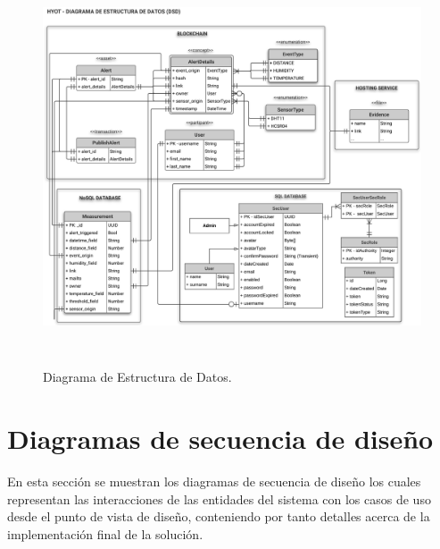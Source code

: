 \documentclass[12pt,a4paper, twoside]{report}
\begin{document}
	\begin{figure}[!ht]   
		\caption{Diagrama de Estructura de Datos.} 
		\begin{center} 
			\includegraphics[width=16cm,height=11cm]{Images/design/p_dsd} \\
			\label{fig:design_dsd} 
		\end{center}  
	\end{figure}
		
	\section{Diagramas de secuencia de diseño}
		
	En esta sección se muestran los diagramas de secuencia de diseño los cuales representan las interacciones de las entidades del sistema con los casos de uso desde el punto de vista de diseño, conteniendo por tanto detalles acerca de la implementación final de la solución. 
			
\end{document}
